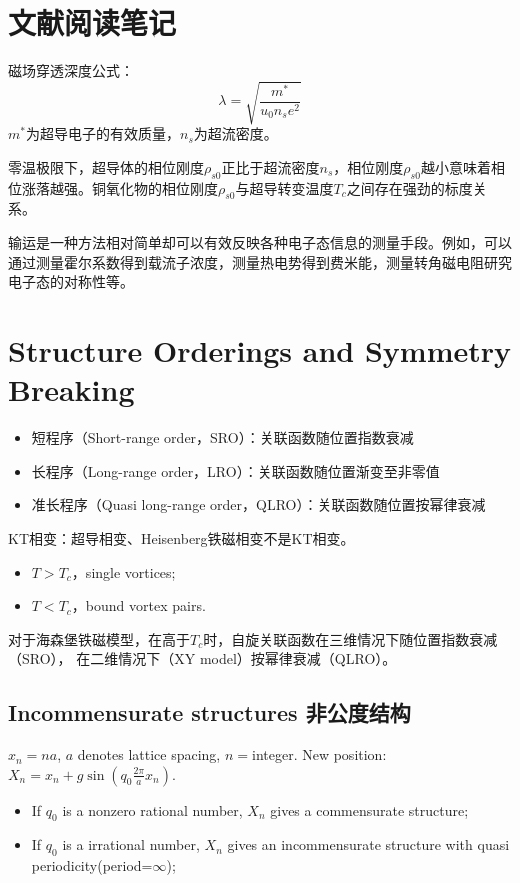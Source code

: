 \documentclass{article}
\begin{document}
\section{文献阅读笔记}
磁场穿透深度公式：
\begin{equation}
    \lambda=\sqrt{\dfrac{m^*}{u_0n_se^2}}
\end{equation}
$m^*$为超导电子的有效质量，$n_s$为超流密度。

零温极限下，超导体的相位刚度$\rho_{s0}$正比于超流密度$n_s$，相位刚度$\rho_{s0}$越小意味着相位涨落越强。铜氧化物的相位刚度$\rho_{s0}$与超导转变温度$T_c$之间存在强劲的标度关系。

输运是一种方法相对简单却可以有效反映各种电子态信息的测量手段。例如，可以通过测量霍尔系数得到载流子浓度，测量热电势得到费米能，测量转角磁电阻研究电子态的对称性等。

\section{Structure Orderings and Symmetry Breaking}
\begin{itemize}
    \item 短程序（Short-range order，SRO）：关联函数随位置指数衰减
    \item 长程序（Long-range order，LRO）：关联函数随位置渐变至非零值
    \item 准长程序（Quasi long-range order，QLRO）：关联函数随位置按幂律衰减
\end{itemize}

KT相变：超导相变、Heisenberg铁磁相变不是KT相变。
\begin{itemize}
    \item $T>T_c$，single vortices;
    \item $T<T_c$，bound vortex pairs.
\end{itemize}

对于海森堡铁磁模型，在高于$T_c$时，自旋关联函数在三维情况下随位置指数衰减（SRO），
在二维情况下（XY model）按幂律衰减（QLRO）。

\subsection{Incommensurate structures 非公度结构}

$x_n=na$, $a$ denotes lattice spacing, $n=$integer. New position: $X_n=x_n+g\sin{(q_0\frac{2\pi}{a}x_n)}$.
\begin{itemize}
    \item If $q_0$ is a nonzero rational number, $X_n$ gives a commensurate structure;
    \item If $q_0$ is a irrational number, $X_n$ gives an incommensurate structure with quasi periodicity(period=$\infty$);
\end{itemize}
\end{document}
